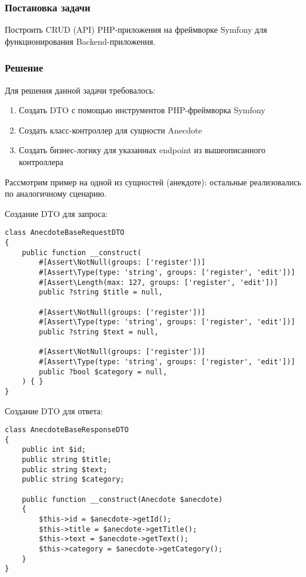 \documentclass[pract]{SCWorks}
\begin{document}
\subsubsection{Постановка задачи}
Построить CRUD (API) PHP-приложения на фреймворке Symfony для функционирования
Backend-приложения. 
\subsubsection{Решение}

Для решения данной задачи требовалось:

\begin{enumerate}
    \item Создать DTO с помощью инструментов PHP-фреймворка Symfony
    \item Создать класс-контроллер для сущности Anecdote
    \item Создать бизнес-логику для указанных endpoint из вышеописанного
    контроллера
\end{enumerate}

Рассмотрим пример на одной из сущностей (анекдоте): остальные реализовались по
аналогичному сценарию.

Создание DTO для запроса:

\begin{verbatim}
class AnecdoteBaseRequestDTO
{
    public function __construct(
        #[Assert\NotNull(groups: ['register'])]
        #[Assert\Type(type: 'string', groups: ['register', 'edit'])]
        #[Assert\Length(max: 127, groups: ['register', 'edit'])]
        public ?string $title = null,

        #[Assert\NotNull(groups: ['register'])]
        #[Assert\Type(type: 'string', groups: ['register', 'edit'])]
        public ?string $text = null,

        #[Assert\NotNull(groups: ['register'])]
        #[Assert\Type(type: 'string', groups: ['register', 'edit'])]
        public ?bool $category = null,
    ) { }
}
\end{verbatim}

Создание DTO для ответа:

\begin{verbatim}
class AnecdoteBaseResponseDTO
{
    public int $id;
    public string $title;
    public string $text;
    public string $category;

    public function __construct(Anecdote $anecdote)
    {
        $this->id = $anecdote->getId();
        $this->title = $anecdote->getTitle();
        $this->text = $anecdote->getText();
        $this->category = $anecdote->getCategory();
    }
}
\end{verbatim}
\end{document}
